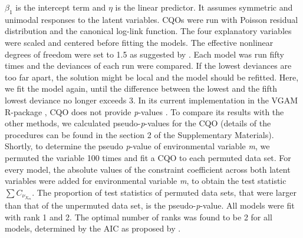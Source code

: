 \documentclass[a4paper,11pt]{article}
\begin{document}
		$\beta_1$ is the intercept term and $\eta$ is the linear predictor. 
        It assumes symmetric and unimodal responses to the latent variables.
		CQOs were run with Poisson residual distribution and the canonical log-link function.
		The four explanatory variables were scaled and centered before fitting the models.
		The effective nonlinear degrees of freedom were set to 1.5 as suggested by \citet{yee2015vector}.
		Each model was run fifty times and the deviances of each run were compared. 
		If the lowest deviances are too far apart, the solution might be local and the model should be refitted.  
		Here, we fit the model again, until the difference between the lowest and the fifth lowest deviance no longer exceeds 3. 
        In its current implementation in the VGAM R-package \citep{VGAM19}, CQO does not provide \textit{p}-values \citep[but see][]{yee2010vglms}. 
        To compare its results with the other methods, we calculated pseudo-\textit{p}-values for the CQO (details of the procedures can be found in the section 2 of the Supplementary Materials).
        Shortly, to determine the pseudo \textit{p}-value of environmental variable \textit{m}, we permuted the variable 100 times and fit a CQO to each permuted data set. 
        For every model, the absolute values of the constraint coefficient across both latent variables were added for environmental variable \textit{m}, to obtain the test statistic $\sum C_{\nu_{X_{m}}}$. 
        The proportion of test statistics of permuted data sets, that were larger than that of the unpermuted data set, is the pseudo-\textit{p}-value. 
	    All models were fit with rank 1 and 2.
		The optimal number of ranks was found to be 2 for all models, determined by the AIC as proposed by \citet{yee2003reduced}.\\

\end{document}
